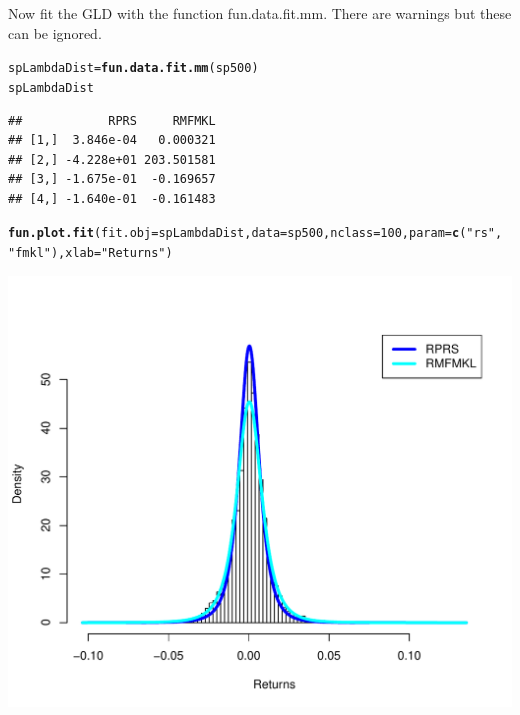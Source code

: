 \documentclass[12pt, a4paper, oneside]{article}\usepackage[]{graphicx}\usepackage[]{color}
\makeatletter
\def\maxwidth{ %
  \ifdim\Gin@nat@width>\linewidth
    \linewidth
  \else
    \Gin@nat@width
  \fi
}
\newcommand{\hlnum}[1]{\textcolor[rgb]{0.686,0.059,0.569}{#1}}%
\newcommand{\hlstr}[1]{\textcolor[rgb]{0.192,0.494,0.8}{#1}}%
\newcommand{\hlstd}[1]{\textcolor[rgb]{0.345,0.345,0.345}{#1}}%
\newcommand{\hlkwb}[1]{\textcolor[rgb]{0.69,0.353,0.396}{#1}}%
\newcommand{\hlkwc}[1]{\textcolor[rgb]{0.333,0.667,0.333}{#1}}%
\newcommand{\hlkwd}[1]{\textcolor[rgb]{0.737,0.353,0.396}{\textbf{#1}}}%
\newenvironment{kframe}{%
 \def\at@end@of@kframe{}%
 \ifinner\ifhmode%
  \def\at@end@of@kframe{\end{minipage}}%
  \begin{minipage}{\columnwidth}%
 \fi\fi%
 \def\FrameCommand##1{\hskip\@totalleftmargin \hskip-\fboxsep
 \colorbox{shadecolor}{##1}\hskip-\fboxsep
     \hskip-\linewidth \hskip-\@totalleftmargin \hskip\columnwidth}%
 \MakeFramed {\advance\hsize-\width
   \@totalleftmargin\z@ \linewidth\hsize
   \@setminipage}}%
 {\par\unskip\endMakeFramed%
 \at@end@of@kframe}
\newenvironment{knitrout}{}{} %
\makeatother
\begin{document}
Now fit the GLD with the function fun.data.fit.mm. There are warnings but these can be ignored. 

\begin{knitrout}
\color{fgcolor}\begin{kframe}
\begin{alltt}
\hlstd{spLambdaDist} \hlkwb{=} \hlkwd{fun.data.fit.mm}\hlstd{(sp500)}
\hlstd{spLambdaDist}
\end{alltt}
\begin{verbatim}
##            RPRS     RMFMKL
## [1,]  3.846e-04   0.000321
## [2,] -4.228e+01 203.501581
## [3,] -1.675e-01  -0.169657
## [4,] -1.640e-01  -0.161483
\end{verbatim}
\begin{alltt}
\hlkwd{fun.plot.fit}\hlstd{(}\hlkwc{fit.obj} \hlstd{= spLambdaDist,} \hlkwc{data} \hlstd{= sp500,} \hlkwc{nclass} \hlstd{=} \hlnum{100}\hlstd{,} \hlkwc{param} \hlstd{=} \hlkwd{c}\hlstd{(}\hlstr{"rs"}\hlstd{,}
    \hlstr{"fmkl"}\hlstd{),} \hlkwc{xlab} \hlstd{=} \hlstr{"Returns"}\hlstd{)}
\end{alltt}
\end{kframe}
\includegraphics[width=\maxwidth]{figure/GLD} 

\end{knitrout}
\end{document}
